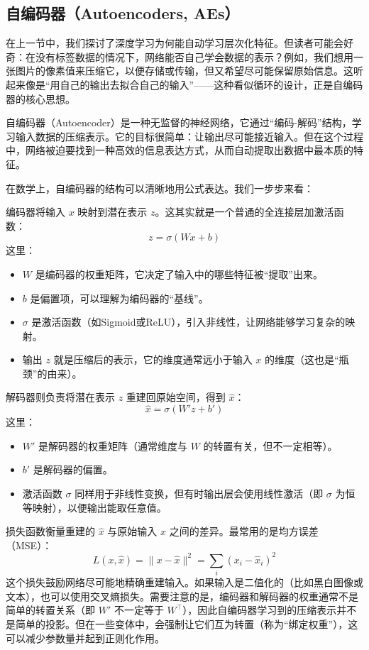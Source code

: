\documentclass[lang=cn,zihao=-4,a4paper,fontset=windows]{beautybook}
\begin{document}
\subsection{自编码器（Autoencoders, AEs）}

在上一节中，我们探讨了深度学习为何能自动学习层次化特征。但读者可能会好奇：在没有标签数据的情况下，网络能否自己学会数据的表示？例如，我们想用一张图片的像素值来压缩它，以便存储或传输，但又希望尽可能保留原始信息。这听起来像是“用自己的输出去拟合自己的输入”——这种看似循环的设计，正是自编码器的核心思想。

自编码器（Autoencoder）是一种无监督的神经网络，它通过“编码-解码”结构，学习输入数据的压缩表示。它的目标很简单：让输出尽可能接近输入。但在这个过程中，网络被迫要找到一种高效的信息表达方式，从而自动提取出数据中最本质的特征。

在数学上，自编码器的结构可以清晰地用公式表达。我们一步步来看：

编码器将输入 \(x\) 映射到潜在表示 \(z\)。这其实就是一个普通的全连接层加激活函数：
\[
z = \sigma(Wx + b)
\]
这里：
\begin{itemize}
\item \(W\) 是编码器的权重矩阵，它决定了输入中的哪些特征被“提取”出来。
\item \(b\) 是偏置项，可以理解为编码器的“基线”。
\item \(\sigma\) 是激活函数（如Sigmoid或ReLU），引入非线性，让网络能够学习复杂的映射。
\item 输出 \(z\) 就是压缩后的表示，它的维度通常远小于输入 \(x\) 的维度（这也是“瓶颈”的由来）。
\end{itemize}
解码器则负责将潜在表示 \(z\) 重建回原始空间，得到 \(\hat{x}\)：
\[
\hat{x} = \sigma(W'z + b')
\]
这里：
\begin{itemize}
\item \(W'\) 是解码器的权重矩阵（通常维度与 \(W\) 的转置有关，但不一定相等）。
\item \(b'\) 是解码器的偏置。
\item 激活函数 \(\sigma\) 同样用于非线性变换，但有时输出层会使用线性激活（即 \(\sigma\) 为恒等映射），以便输出能取任意值。
\end{itemize}
损失函数衡量重建的 \(\hat{x}\) 与原始输入 \(x\) 之间的差异。最常用的是均方误差（MSE）：
\[
L(x, \hat{x}) = \|x - \hat{x}\|^2 = \sum_i (x_i - \hat{x}_i)^2
\]
这个损失鼓励网络尽可能地精确重建输入。如果输入是二值化的（比如黑白图像或文本），也可以使用交叉熵损失。需要注意的是，编码器和解码器的权重通常不是简单的转置关系（即 \(W'\) 不一定等于 \(W^\top\)），因此自编码器学习到的压缩表示并不是简单的投影。但在一些变体中，会强制让它们互为转置（称为“绑定权重”），这可以减少参数量并起到正则化作用。
\end{document}
